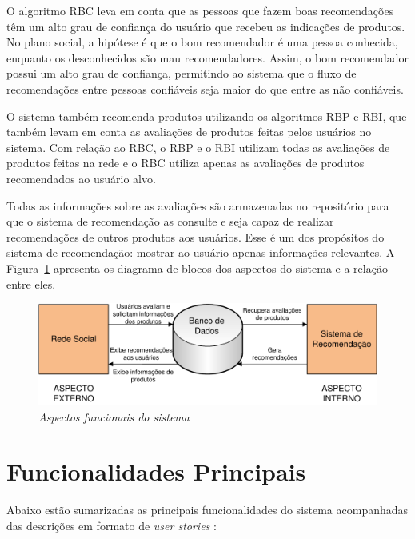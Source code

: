  O algoritmo RBC leva em conta que as pessoas que fazem boas recomendações têm um alto grau de confiança do usuário que recebeu as indicações de produtos. No plano social, a hipótese é que o bom recomendador é uma pessoa conhecida, enquanto os desconhecidos são mau recomendadores. Assim, o bom recomendador possui um alto grau de confiança, permitindo ao sistema que o fluxo de recomendações entre pessoas confiáveis seja maior do que entre as não confiáveis.
 
 O sistema também recomenda produtos utilizando os algoritmos RBP e RBI, que também levam em conta as avaliações de produtos feitas pelos usuários no sistema. Com relação ao RBC, o RBP e o RBI utilizam todas as avaliações de produtos feitas na rede e o RBC utiliza apenas as avaliações de produtos recomendados ao usuário alvo.
 
 Todas as informações sobre as avaliações são armazenadas no repositório para que o sistema de recomendação as consulte e seja capaz de realizar recomendações de outros produtos aos usuários. Esse é um dos propósitos do sistema de recomendação: mostrar ao usuário apenas informações relevantes. A Figura~\ref{fig:aspectos_funcionais} apresenta os diagrama de blocos dos aspectos do sistema e a relação entre eles.
 
\begin{figure}
 \centering
 \includegraphics[width=\textwidth]{imagens/Implementacao_Detalhe2}
 \caption{\it Aspectos funcionais do sistema}
 \label{fig:aspectos_funcionais}
\end{figure}

\section{Funcionalidades Principais} %
\label{sec:funcionalidades_principais}

Abaixo estão sumarizadas as principais funcionalidades do sistema acompanhadas das descrições em formato de \textit{user stories} \cite{557458}:

